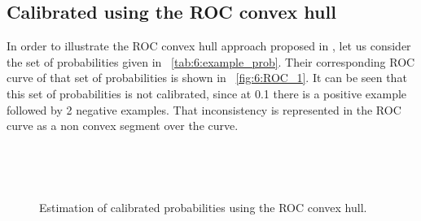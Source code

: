 \subsection{Calibrated using the ROC convex hull}

In order to illustrate the ROC convex hull approach proposed in \citep{Hernandez-Orallo2012},
let us consider the set of probabilities given in \figurename{~\ref{tab:6:example_prob}}.
Their corresponding  ROC curve of that set of probabilities is shown in 
\figurename{~\ref{fig:6:ROC_1}}.  It can be seen that this set of probabilities is not calibrated, 
since at 0.1 there is a positive example  followed by 2 negative examples. That inconsistency is 
represented in the ROC curve as a non convex segment  over the curve.
  
\begin{figure}[!t]
\hskip 0.5cm
\hbox{
  \hskip 0.5cm
}
\vskip 1.5cm

\hbox{ 
  \hskip 1cm
}
\caption{Estimation of calibrated probabilities using the ROC convex hull.}\label{fig:6:rocch}
\end{figure}

